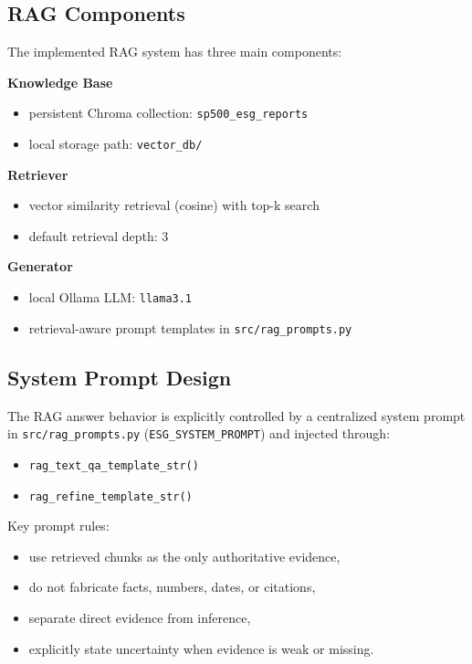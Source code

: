 \documentclass[11pt]{article}
\newcommand{\topK}{3}
\begin{document}
\subsection{RAG Components}
The implemented RAG system has three main components:

\textbf{Knowledge Base}
\begin{itemize}
    \item persistent Chroma collection: \texttt{sp500\_esg\_reports}
    \item local storage path: \texttt{vector\_db/}
\end{itemize}

\textbf{Retriever}
\begin{itemize}
    \item vector similarity retrieval (cosine) with top-k search
    \item default retrieval depth: \topK
\end{itemize}

\textbf{Generator}
\begin{itemize}
    \item local Ollama LLM: \texttt{llama3.1}
    \item retrieval-aware prompt templates in \texttt{src/rag\_prompts.py}
\end{itemize}

\subsection{System Prompt Design}
The RAG answer behavior is explicitly controlled by a centralized system prompt in \texttt{src/rag\_prompts.py} (\texttt{ESG\_SYSTEM\_PROMPT}) and injected through:
\begin{itemize}
    \item \texttt{rag\_text\_qa\_template\_str()}
    \item \texttt{rag\_refine\_template\_str()}
\end{itemize}

Key prompt rules:
\begin{itemize}
    \item use retrieved chunks as the only authoritative evidence,
    \item do not fabricate facts, numbers, dates, or citations,
    \item separate direct evidence from inference,
    \item explicitly state uncertainty when evidence is weak or missing.
\end{itemize}
\end{document}
